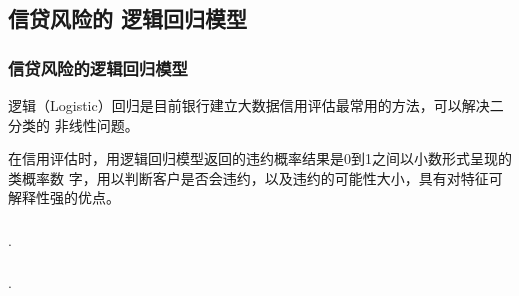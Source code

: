 \documentclass[t]{beamer}
\begin{document}
\subsection{信贷风险的
逻辑回归模型}
\begin{frame}[fragile]
  \frametitle{信贷风险的逻辑回归模型}
  逻辑（Logistic）回归是目前银行建立大数据信用评估最常用的方法，可以解决二分类的
  非线性问题。
  
  在信用评估时，用逻辑回归模型返回的违约概率结果是0到1之间以小数形式呈现的类概率数
  字，用以判断客户是否会违约，以及违约的可能性大小，具有对特征可解释性强的优点。


\end{frame}


\begin{frame}[fragile]
  \frametitle{}
.
  

\end{frame}

\begin{frame}[fragile]
  \frametitle{}
.
  

\end{frame}
\end{document}
